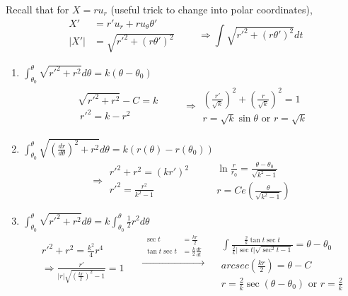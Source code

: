 \documentclass[twoside]{amsart}
\theoremstyle{plain}
\theoremstyle{definition}
\newcommand{\exercisehead}[1]
  {\smallskip
   \noindent{\small\bf Exercise #1.}}
\begin{document}
\exercisehead{21} Recall that for $X =ru_r$ (useful trick to change into polar coordinates), 
\[
\begin{aligned}
  X' & = r' u_r + ru_{\theta} \theta' \\
  |X'| & = \sqrt{ r'^2 + (r\theta')^2 } 
\end{aligned} \quad \quad \Longrightarrow \int \sqrt{ r'^2 + (r\theta')^2 } dt 
\]
\begin{enumerate}
\item $\int_{\theta_0}^{\theta} \sqrt{ r'^2 + r^2 } d\theta = k (\theta -\theta_0)$
\[
\begin{gathered}
  \begin{gathered}
  \sqrt{ r'^2 + r^2 } - C = k  \\\
  r'^2 = k-r^2 
  \end{gathered} \quad \quad \, \Longrightarrow 
  \begin{gathered}
    \left( \frac{r'}{\sqrt{k}} \right)^2 + \left( \frac{r}{ \sqrt{k} } \right)^2 = 1 \\
  \boxed{  r =\sqrt{k} \sin{\theta} \text{ or } r = \sqrt{k } }
  \end{gathered}
\end{gathered}
\]
\item $\int_{\theta_0}^{\theta} \sqrt{ \left( \frac{dr}{d\theta} \right)^2 + r^2 } d\theta = k (r(\theta) - r(\theta_0) )$
\[
\Longrightarrow \begin{gathered}
  r'^2 + r^2 = (kr')^2 \\
  r'^2 = \frac{r^2 }{k^2 -1 } 
\end{gathered} \quad \quad 
\begin{gathered}
  \ln{ \frac{r}{r_0} } = \frac{ \theta - \theta_0}{ \sqrt{ k^2 - 1 } } \\
  \boxed{ r = C e\left( \frac{\theta}{\sqrt{ k^2 - 1 } } \right) }
\end{gathered}
\]
\item $\int_{\theta_0}^{\theta} \sqrt{ r'^2 + r^2 } d\theta = k \int_{\theta_0}^{\theta} \frac{1}{2} r^2 d\theta$ 
\[
\begin{gathered}
  \begin{gathered}
    r'^2 + r^2 = \frac{ k^2 }{4} r^4 \\
    \Longrightarrow \frac{ r' }{ |r| \sqrt{ \left( \frac{kr}{2} \right)^2 - 1 } } = 1 
\end{gathered} \quad \, \xrightarrow{ 
    \begin{aligned} 
      \sec{t} & = \frac{kr}{2} \\
      \tan{t} \sec{t} & = \frac{k}{2} \frac{dr}{dt } 
\end{aligned} } \quad \begin{gathered}
    \int \frac{ \frac{2}{k} \tan{t}\sec{t} }{ \frac{2}{k} |\sec{t} | \sqrt{ \sec^2{t} - 1 }} = \theta - \theta_0  \\
    arcsec{ \left( \frac{kr}{2} \right) } = \theta - C \\
    \boxed{ r = \frac{2}{k} \sec{(\theta -\theta_0) } } \text{ or } r = \frac{2}{k}
\end{gathered}    
\end{gathered}
\]
\end{enumerate}
\end{document}
